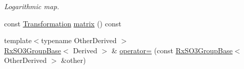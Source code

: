 \begin{DoxyCompactItemize}
\begin{DoxyCompactList}\small\item\em Logarithmic map. \end{DoxyCompactList}\item 
const \hyperlink{class_sophus_1_1_rx_s_o3_group_base_a60b2d8cd20692d3d39e5e7c729d95145}{Transformation} \hyperlink{class_sophus_1_1_rx_s_o3_group_base_ae2fcf316d587e4bedba18125149f4f14}{matrix} () const 
\item 
{\footnotesize template$<$typename Other\+Derived $>$ }\\\hyperlink{class_sophus_1_1_rx_s_o3_group_base}{Rx\+S\+O3\+Group\+Base}$<$ Derived $>$ \& \hyperlink{class_sophus_1_1_rx_s_o3_group_base_adaef92c98a49d7eeb559b531c58324e1}{operator=} (const \hyperlink{class_sophus_1_1_rx_s_o3_group_base}{Rx\+S\+O3\+Group\+Base}$<$ Other\+Derived $>$ \&other)\hypertarget{class_sophus_1_1_rx_s_o3_group_base_adaef92c98a49d7eeb559b531c58324e1}{}\label{class_sophus_1_1_rx_s_o3_group_base_adaef92c98a49d7eeb559b531c58324e1}


\end{DoxyCompactItemize}
